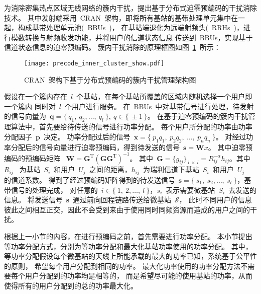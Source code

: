 为消除密集热点区域无线网络的簇内干扰，提出基于分布式迫零预编码的干扰消除技术。
其中发射端采用~CRAN~架构，即将所有基站的基带处理单元集中在一起，构成基带处理单元池(~BBUs~)，
在基站端退化为远端射频头(~RRHs~)，进行模数转换与射频收发功能，并将用户的信道状态信息
传送到~BBUs，实现基于信道状态信息的迫零预编码。
簇内干扰消除的原理框图如图~\ref{precode_inner_cluster_show}~所示：
\begin{figure}[htbp]
\centering
\texttt{[image: precode\_inner\_cluster\_show.pdf]}
\caption{CRAN~架构下基于分布式预编码的簇内干扰管理架构图}\vspace{-0.5em}
\label{precode_inner_cluster_show}
\end{figure}
假设在一个簇内存在~$l$~个基站，在每个基站所覆盖的区域内随机选择一个用户即一个簇内
同时对~$l$~个用户进行服务。
在~BBUs~中对基带信号进行处理，待发射的信号向量为~$\mathbf{q}=\{~q_1,~q_2,\dots,~q_l~\}, ~q\in\{~\pm 1~\}$。
在基于迫零预编码的簇内干扰管理算法中，首先要给待传送的信号进行功率分配。
每个用户所分配的功率由功率分配因子~$\mathbf{p}$~决定。
功率分配过后的信号~$\mathbf{x}=\{~p_1q_1,~p_2q_2,~\dots,~p_nq_n~\}$。
对经过功率分配后的信号向量进行迫零预编码，得到待发送的信号~$\mathbf{s}=\mathbf{W}x$。
其中迫零预编码的预编码矩阵
~$\mathbf{W}=\mathbf{G}^{\mathrm{T}}(\mathbf{G}\mathbf{G}^{\mathrm{T}})^{-1}$。
其中~$\mathbf{G}=\{g_{ij}\}_{~l~\times~ l}=R_{ij}^{-\alpha}h_{ij}$。其中~$R_{ij}$~
为基站~$S_i$~和用户~$U_j$~之间的距离，$h_{ij}$~为瑞利信道下基站~$S_i$~和用户~$U_j$~
的信道系数。
得到了经过预编码矩阵得到的待发送信号~$\mathbf{s}=\{~s_1,~s_2,\dots,~s_l~\}$，基带信号的处理完成，
对任意的~$i\in\{~1,~2,\dots,~l~\}$，$s_i$~表示需要微基站~$S_i$~去发送的信息。
将发送信号~$\mathbf{s}$~通过前向回程链路传送给微基站~$\mathcal{S}$，
此时不同用户的信息彼此之间相互正交，因此不会受到来由于使用同时同频资源而造成的用户之间的干扰。

根据上一小节的内容，在进行预编码之前，首先需要进行功率分配。
本小节提出等功率分配方式，分别为等功率分配和最大化基站功率使用的功率分配。
其中，等功率分配假设每个微基站的天线上所能承载的最大的功率已知，系统基于公平性的原则，
希望每个用户分配到相同的功率。
最大化功率使用的功率分配方法不需要每个用户分配到的功率均是相等的，
而是希望尽可能的使用基站的功率，从而使得所有的用户分配到的总的功率最大化。

